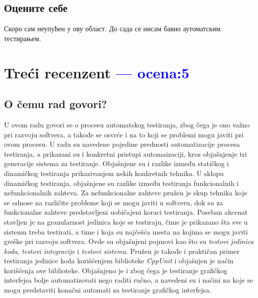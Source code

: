 \documentclass[a4paper]{report}
\newcommand{\odgovor}[1]{\textcolor{blue}{#1}}
\begin{document}
\section{Оцените себе}
Скоро сам неупућен у ову област. До сада се нисам бавио аутоматским тестирањем.


\chapter{Treći recenzent \odgovor{--- ocena:5} }

\section{O čemu rad govori?}
U ovom radu govori se o procesu automatskog testiranja, zbog čega je ono važno pri razvoju softvera, a takođe se osvrće i na to koji se problemi mogu javiti pri ovom procesu. U radu su navedene pojedine prednosti automatizacije procesa testiranja, a prikazani su i konkretni pristupi automaizaciji, kroz objašnjenje tri generacije sistema za testiranje. Objašnjene su i razlike između statičkog i dinamičkog testiranja prikazivanjem nekih konkretnih tehnika. U sklopu dinamičkog testiranja, objašnjene su razlike između testiranja funkcionalnih i nefunkcionalnih zahteva. Za nefunkcionalne zahteve pružen je skup tehnika koje se odnose na različite probleme koji se mogu javiti u softveru, dok su za funkcionalne zahteve predstavljeni uobičajeni koraci testiranja. Poseban akcenat stavljen je na granularnost jedinica koje se testiraju, čime je prikazano šta sve u sistemu treba testirati, a time i koja su najčešća mesta na kojima se mogu javiti greške pri razvoju softvera. Ovde su objašnjeni pojmovi kao što su \textit{testovi jedinica koda}, \textit{testovi integracije} i \textit{testovi sistema}. Pružen je takođe i praktičan primer testiranja jedinice koda korišćenjem biblioteke \textit{CppUnit} i objašnjen je način korišćenja ove biblioteke. Objašnjeno je i zbog čega je testiranje grafičkog interfejsa bolje automatizovati nego raditi ručno, a navedeni su i načini na koje se mogu predstaviti konačni automati za testiranje grafičkog interfejsa. 
\end{document}
